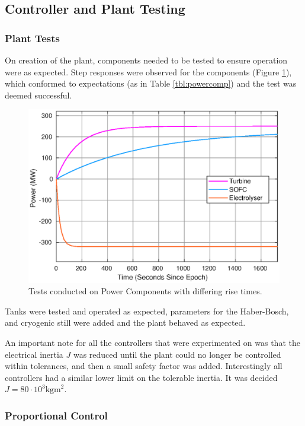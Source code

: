 \subsection{Controller and Plant Testing}
\label{sec:pwrtesting}

\subsubsection{Plant Tests}

On creation of the plant, components needed to be tested to ensure operation were as expected.
Step responses were observed for the components (Figure \ref{fig:power-risetime}), which conformed to expectations (as in Table \ref{tbl:powercomp}) and the test was deemed successful.

\begin{figure}[ht]
    \centering
    \includegraphics[scale=0.5]{images/results/risetime.eps}
    \caption{Tests conducted on Power Components with differing rise times.}
    \label{fig:power-risetime}
\end{figure}

Tanks were tested and operated as expected, parameters for the Haber-Bosch, and cryogenic still were added and the plant behaved as expected.

An important note for all the controllers that were experimented on was that the electrical inertia $J$ was reduced until the plant could no longer be controlled within tolerances, and then a small safety factor was added.
Interestingly all controllers had a similar lower limit on the tolerable inertia.
It was decided $J = 80 \cdot 10^{3}\text{kgm}^{2}$.

\subsubsection{Proportional Control}

